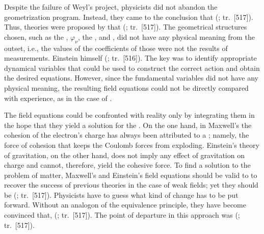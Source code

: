 \documentclass[final]{article}
\newcommand{\phin}{\ensuremath{\varphi_\nu}\xspace}
\renewcommand{\rzlap}[2]{(\cite[#1]{Reichenbach1928}; tr.\ [#2])\xspace}
\begin{document}
Despite the failure of Weyl's project, physicists did not abandon the geometrization program. Instead, they came to the conclusion that  \rzlap{371}{517}. Thus, theories were proposed by  that  \rzlap{371}{517}. The geometrical structures chosen, such as the \Gtmn, \phin, the \Gtmn, and \gmn, did not have any physical meaning from the outset, i.e., the values of the coefficients of those  were not the results of measurements. Einstein himself  \rzlap{369}{516}. The key was to identify appropriate dynamical variables that could be used to construct the correct action and obtain the desired equations. However, since the fundamental variables did not have any physical meaning, the resulting field equations could not be directly compared with experience, as in the case of \gr.

The field equations could be confronted with reality only by integrating them in the hope that they yield a solution for the . On the one hand, in Maxwell's \ed the cohesion of the electron's charge has always been attributed to a ; namely, the force of cohesion that keeps the Coulomb forces from exploding. Einstein's theory of gravitation, on the other hand, does not imply any effect of gravitation on charge and cannot, therefore, yield the cohesive force. To find a solution to the problem of matter, Maxwell's and Einstein's field equations should be valid to  to recover the success of previous theories in the case of weak fields; yet they should be  \rzlap{370}{517}. Physicists have to guess what kind of change has to be put forward. Without an analogon of the equivalence principle, they have become convinced that,  \rzlap{371}{517}. The point of departure in this approach was  \rzlap{370}{517}. 
\end{document}
